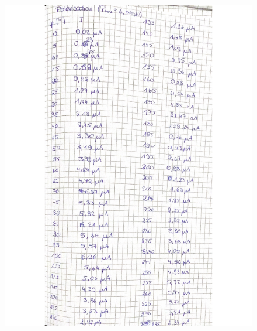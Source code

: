 \begin{figure}[H]
  \centering
  \includegraphics[width=\textwidth]{"Messwerte/V61Messdaten_04.pdf"}
  \label{fig:Messungen_4}
\end{figure}

